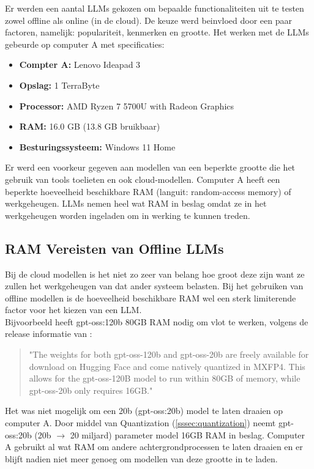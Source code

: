 Er werden een aantal LLMs gekozen om bepaalde functionaliteiten uit te testen zowel offline als online (in de cloud). De keuze werd beinvloed door een paar factoren, namelijk: populariteit, kenmerken en grootte.
Het werken met de LLMs gebeurde op computer A met specificaties:
\begin{itemize}
    \item \textbf{Compter A:} Lenovo Ideapad 3
    \item \textbf{Opslag:} 1 TerraByte
    \item \textbf{Processor:} AMD Ryzen 7 5700U with Radeon Graphics
    \item \textbf{RAM:} 16.0 GB (13.8 GB bruikbaar)
    \item \textbf{Besturingssysteem:} Windows 11 Home
\end{itemize}
Er werd een voorkeur gegeven aan modellen van een beperkte grootte die het gebruik van tools toelieten en ook cloud-modellen. Computer A heeft een beperkte hoeveelheid beschikbare RAM (languit: random-access memory) of werkgeheugen. LLMs nemen heel wat RAM in beslag omdat ze in het werkgeheugen worden ingeladen om in werking te kunnen treden.%

\subsection{RAM Vereisten van Offline LLMs}
\label{ssec:ramvereistenofflinellms}

Bij de cloud modellen is het niet zo zeer van belang hoe groot deze zijn want ze zullen het werkgeheugen van dat ander systeem belasten. Bij het gebruiken van offline modellen is de hoeveelheid beschikbare RAM wel een sterk limiterende factor voor het kiezen van een LLM. \\

Bijvoorbeeld heeft gpt-oss:120b 80GB RAM nodig om vlot te werken, volgens de release informatie van \autocite{OpenAI2025}:

\begin{quote}
    "The weights for both gpt-oss-120b and gpt-oss-20b are freely available for download on Hugging Face and come natively quantized in MXFP4. This allows for the gpt-oss-120B model to run within 80GB of memory, while gpt-oss-20b only requires 16GB."
\end{quote}

Het was niet mogelijk om een 20b (gpt-oss:20b) model te laten draaien op computer A. Door middel van Quantization (\ref{sssec:quantization}) neemt gpt-oss:20b (20b $\rightarrow$ 20 miljard) parameter model 16GB RAM in beslag.  Computer A gebruikt al wat RAM om andere achtergrondprocessen te laten draaien en er blijft nadien niet meer genoeg om modellen van deze grootte in te laden. \\

